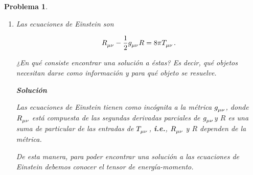 \documentclass[12pt]{article}
\theoremstyle{break}
\newtheorem{exercise}{Problema}
\theoremstyle{nonumberbreak}
\newcommand*{\inlinesol}{\vspace*{10pt}\textbf{Solución}\vspace*{10pt}}
\begin{document}
\begin{exercise}
\begin{enumerate}[label = \alph*)]
            \item Las ecuaciones de Einstein son
            
            \begin{equation}
                \tensor{R}{_{\mu\nu}} - \dfrac{1}{2}\tensor{g}{_{\mu\nu}}R = 8\pi\tensor{T}{_{\mu\nu}}. 
                \label{eq:EinsteinEqs}
            \end{equation}

            ¿En qué consiste encontrar una solución a éstas? Es decir, qué objetos necesitan darse como información y para qué objeto se resuelve.

            \inlinesol

            Las ecuaciones de Einstein tienen como incógnita a la métrica \(\tensor{g}{_{\mu\nu}}\), donde \(\tensor{R}{_{\mu\nu}}\) está compuesta de las segundas derivadas parciales de \(\tensor{g}{_{\mu\nu}}\)y \(R\) es una suma de particular de las entradas de \(\tensor{T}{_{\mu\nu}}\), \textbf{i.e.}, \(\tensor{R}{_{\mu\nu}}\) y \(R\) dependen de la métrica.

            De esta manera, para poder encontrar una solución a las ecuaciones de Einstein debemos conocer el tensor de energía-momento.
        \end{enumerate}
    \end{exercise}
\end{document}
